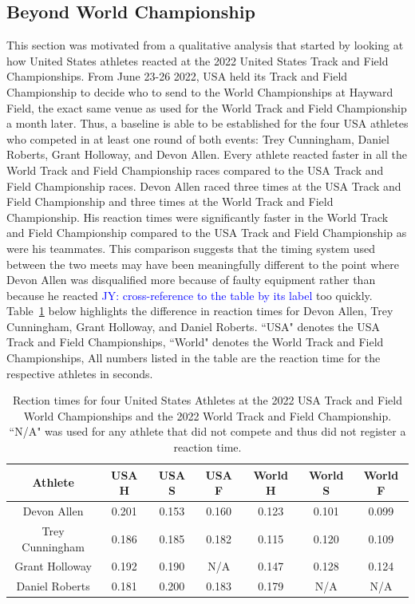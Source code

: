 \documentclass[12pt, letterpaper, titlepage]{article}
\newcommand{\jy}[1]{\textcolor{blue}{JY: #1}}
\begin{document}
\subsection{Beyond World Championship}
This section was motivated from a qualitative analysis that started by looking
at how United States athletes reacted at the 2022 United States Track and Field
Championships. From June 23-26 2022, USA held its Track
and Field Championship to decide who to send to the World Championships at Hayward 
Field, the exact same venue as used for the World Track and Field Championship a month 
later.  Thus, a baseline is able to be established for the four USA athletes who 
competed in at least one round of both events: Trey Cunningham, Daniel Roberts, 
Grant Holloway, and Devon Allen. Every athlete reacted faster in all the World 
Track and Field Championship races compared to the USA Track and Field 
Championship races. Devon Allen raced three times at the USA Track and
Field Championship and three times at the World Track and Field  Championship. 
His reaction times were significantly faster in the World Track and
Field Championship compared to the USA Track and Field Championship as were his
teammates.  This comparison suggests that the timing system used between the two
meets may have been meaningfully different to the point where Devon Allen was
disqualified more because of faulty equipment rather than because he reacted
\jy{cross-reference to the table by its label}
too quickly.  Table~\ref{fig:USAvsWorld} below highlights the difference in reaction times for
Devon Allen, Trey Cunningham, Grant Holloway, and Daniel Roberts. ``USA" denotes
the USA Track and Field Championships, ``World" denotes the World Track and Field
Championships,   All numbers listed in the table are the reaction
time for the respective athletes in seconds. 

\begin{table}
\begin{center}
  \begin{tabular}{c c c c c c c} 
   \toprule
   Athlete & USA H & USA S & USA F & World H & World S & World F \\ [0.5ex] 
   \midrule
   Devon Allen & 0.201 & 0.153 & 0.160 & 0.123 & 0.101 & 0.099 \\ 
   Trey Cunningham & 0.186 & 0.185 & 0.182 & 0.115 & 0.120 & 0.109 \\
   Grant Holloway & 0.192 & 0.190 & N/A & 0.147 & 0.128 & 0.124 \\
   Daniel Roberts & 0.181 & 0.200 & 0.183 & 0.179 & N/A & N/A \\ [0.5ex]
   \bottomrule
  \end{tabular}
  \label{fig:USAvsWorld}
  \caption{Rection times for four United States Athletes at the 2022 USA Track
  and Field World Championships and the 2022 World Track and Field Championship.
  ``N/A" was used for any athlete that did not compete and thus did not register 
  a reaction time.}
  \end{center}
\end{table}
\end{document}
